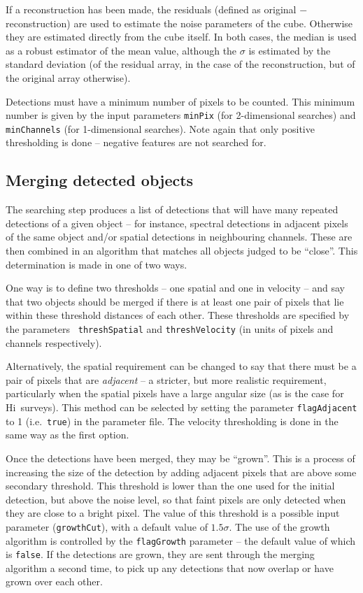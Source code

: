 \documentclass[12pt,a4paper]{article}
\newcommand{\ie}{i.e.\ }
\newcommand{\hi}{H{\sc i}}
\begin{document}
If a reconstruction has been made, the residuals (defined as original
$-$ reconstruction) are used to estimate the noise parameters of the
cube. Otherwise they are estimated directly from the cube itself. In
both cases, the median is used as a robust estimator of the mean
value, although the $\sigma$ is estimated by the standard deviation
(of the residual array, in the case of the reconstruction, but of the
original array otherwise).

Detections must have a minimum number of pixels to be counted. This
minimum number is given by the input parameters {\tt minPix} (for
2-dimensional searches) and {\tt minChannels} (for 1-dimensional
searches). Note again that only positive thresholding is done --
negative features are not searched for.

\subsection{Merging detected objects}
\label{sec-merger}

The searching step produces a list of detections that will have many
repeated detections of a given object -- for instance, spectral
detections in adjacent pixels of the same object and/or spatial
detections in neighbouring channels. These are then combined in an
algorithm that matches all objects judged to be ``close''. This
determination is made in one of two ways.

One way is to define two thresholds -- one spatial and one in velocity
-- and say that two objects should be merged if there is at least one
pair of pixels that lie within these threshold distances of each
other. These thresholds are specified by the parameters {\tt
threshSpatial} and {\tt threshVelocity} (in units of pixels and
channels respectively).

Alternatively, the spatial requirement can be changed to say that
there must be a pair of pixels that are {\it adjacent} -- a stricter,
but more realistic requirement, particularly when the spatial pixels
have a large angular size (as is the case for \hi\ surveys). This
method can be selected by setting the parameter
{\tt flagAdjacent} to 1 (\ie {\tt true}) in the parameter file. The
velocity thresholding is done in the same way as the first option.

Once the detections have been merged, they may be ``grown''. This is a
process of increasing the size of the detection by adding adjacent
pixels that are above some secondary threshold. This threshold is
lower than the one used for the initial detection, but above the noise
level, so that faint pixels are only detected when they are close to a
bright pixel. The value of this threshold is a possible input
parameter ({\tt growthCut}), with a default value of $1.5\sigma$. The
use of the growth algorithm is controlled by the {\tt flagGrowth}
parameter -- the default value of which is {\tt false}. If the
detections are grown, they are sent through the merging algorithm a
second time, to pick up any detections that now overlap or have grown
over each other.
\end{document}

